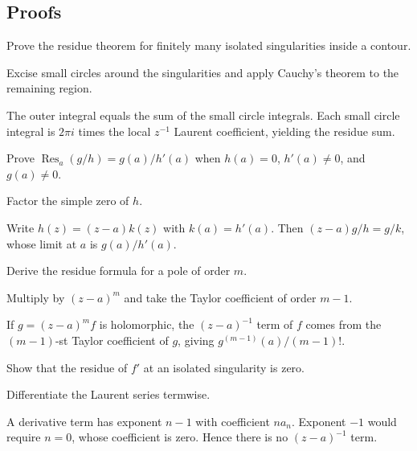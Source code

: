 \subsection*{Proofs}

\begin{exercise}\label{exr:iv10-expand-06}
Prove the residue theorem for finitely many isolated singularities inside a contour.
\end{exercise}
\begin{hint}
Excise small circles around the singularities and apply Cauchy's theorem to the remaining region.
\end{hint}
\begin{solution}
The outer integral equals the sum of the small circle integrals. Each small circle integral is \(2\pi i\) times the local \(z^{-1}\) Laurent coefficient, yielding the residue sum.
\end{solution}

\begin{exercise}\label{exr:iv10-expand-07}
Prove \(\operatorname{Res}_a(g/h)=g(a)/h'(a)\) when \(h(a)=0\), \(h'(a)\ne0\), and \(g(a)\ne0\).
\end{exercise}
\begin{hint}
Factor the simple zero of \(h\).
\end{hint}
\begin{solution}
Write \(h(z)=(z-a)k(z)\) with \(k(a)=h'(a)\). Then \((z-a)g/h=g/k\), whose limit at \(a\) is \(g(a)/h'(a)\).
\end{solution}

\begin{exercise}\label{exr:iv10-expand-08}
Derive the residue formula for a pole of order \(m\).
\end{exercise}
\begin{hint}
Multiply by \((z-a)^m\) and take the Taylor coefficient of order \(m-1\).
\end{hint}
\begin{solution}
If \(g=(z-a)^m f\) is holomorphic, the \((z-a)^{-1}\) term of \(f\) comes from the \((m-1)\)-st Taylor coefficient of \(g\), giving \(g^{(m-1)}(a)/(m-1)!\).
\end{solution}

\begin{exercise}\label{exr:iv10-expand-09}
Show that the residue of \(f'\) at an isolated singularity is zero.
\end{exercise}
\begin{hint}
Differentiate the Laurent series termwise.
\end{hint}
\begin{solution}
A derivative term has exponent \(n-1\) with coefficient \(na_n\). Exponent \(-1\) would require \(n=0\), whose coefficient is zero. Hence there is no \((z-a)^{-1}\) term.
\end{solution}

